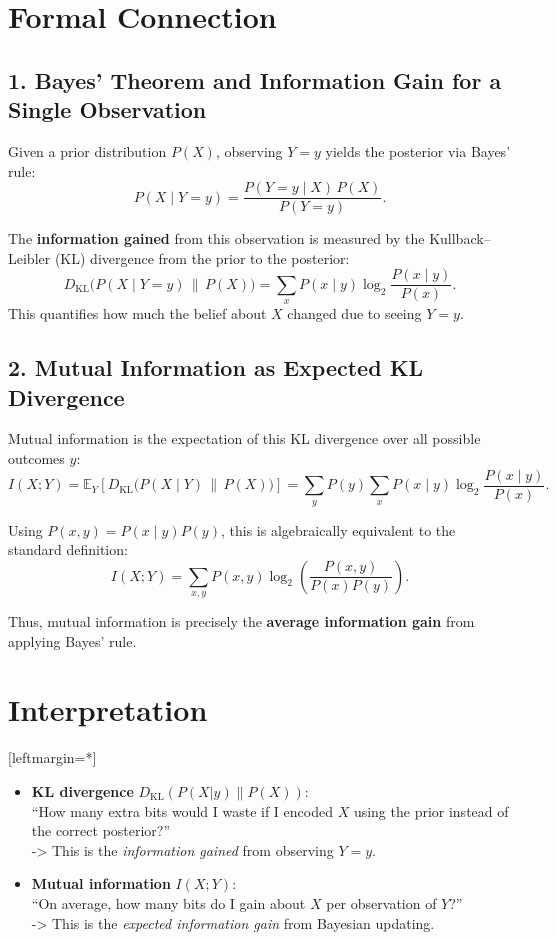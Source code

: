 \documentclass[11pt]{article}
\begin{document}
\section*{Formal Connection}

\subsection*{1. Bayes' Theorem and Information Gain for a Single Observation}

Given a prior distribution \(P(X)\), observing \(Y = y\) yields the posterior via Bayes' rule:
\[
P(X \mid Y = y) = \frac{P(Y = y \mid X)\, P(X)}{P(Y = y)}.
\]

The \textbf{information gained} from this observation is measured by the Kullback–Leibler (KL) divergence from the prior to the posterior:
\[
D_{\mathrm{KL}}\big(P(X \mid Y = y) \,\|\, P(X)\big) 
= \sum_{x} P(x \mid y) \log_2 \frac{P(x \mid y)}{P(x)}.
\]
This quantifies how much the belief about \(X\) changed due to seeing \(Y = y\).

\subsection*{2. Mutual Information as Expected KL Divergence}

Mutual information is the expectation of this KL divergence over all possible outcomes \(y\):
\[
\boxed{
I(X;Y) = \mathbb{E}_{Y}\!\left[ D_{\mathrm{KL}}\big(P(X \mid Y) \,\|\, P(X)\big) \right]
= \sum_{y} P(y) \sum_{x} P(x \mid y) \log_2 \frac{P(x \mid y)}{P(x)}.
}
\]

Using \(P(x,y) = P(x \mid y) P(y)\), this is algebraically equivalent to the standard definition:
\[
I(X;Y) = \sum_{x,y} P(x,y) \log_2 \left( \frac{P(x,y)}{P(x) P(y)} \right).
\]

Thus, mutual information is precisely the \textbf{average information gain} from applying Bayes' rule.

\section*{Interpretation}


[leftmargin=*]\begin{itemize}
    \item \textbf{KL divergence} \(D_{\mathrm{KL}}(P(X|y) \| P(X))\): \\
    ``How many extra bits would I waste if I encoded \(X\) using the prior instead of the correct posterior?'' \\
    -> This is the \emph{information gained} from observing \(Y = y\).

    \item \textbf{Mutual information} \(I(X;Y)\): \\
    ``On average, how many bits do I gain about \(X\) per observation of \(Y\)?'' \\
    -> This is the \emph{expected information gain} from Bayesian updating.
\end{itemize}
\end{document}
